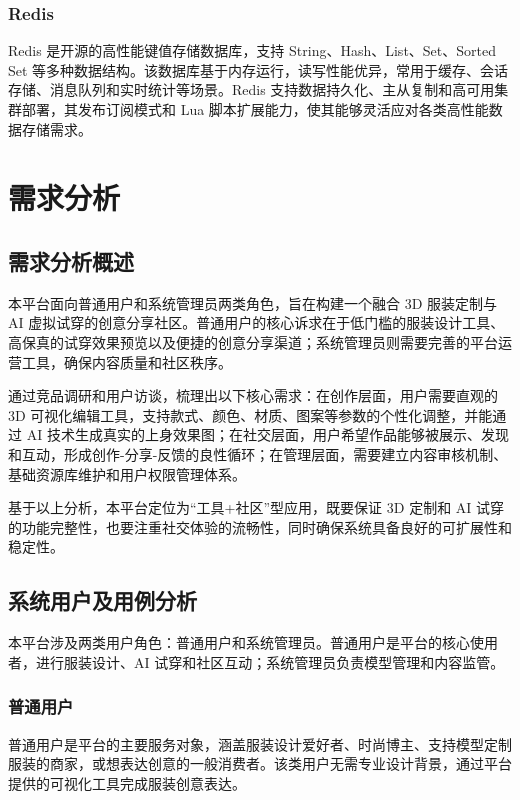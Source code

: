 \documentclass[twoside]{thesis-cls-Miya} %
\begin{document}
\subsection{Redis}
Redis 是开源的高性能键值存储数据库\cite{redis_docs}，支持 String、Hash、List、Set、Sorted Set 等多种数据结构。该数据库基于内存运行，读写性能优异，常用于缓存、会话存储、消息队列和实时统计等场景。Redis 支持数据持久化、主从复制和高可用集群部署，其发布订阅模式和 Lua 脚本扩展能力，使其能够灵活应对各类高性能数据存储需求。

\chapter{需求分析}

\section{需求分析概述}

本平台面向普通用户和系统管理员两类角色，旨在构建一个融合 3D 服装定制与 AI 虚拟试穿的创意分享社区。普通用户的核心诉求在于低门槛的服装设计工具、高保真的试穿效果预览以及便捷的创意分享渠道；系统管理员则需要完善的平台运营工具，确保内容质量和社区秩序。

通过竞品调研和用户访谈，梳理出以下核心需求：在创作层面，用户需要直观的 3D 可视化编辑工具，支持款式、颜色、材质、图案等参数的个性化调整，并能通过 AI 技术生成真实的上身效果图；在社交层面，用户希望作品能够被展示、发现和互动，形成创作\texorpdfstring{-}{-}分享\texorpdfstring{-}{-}反馈的良性循环；在管理层面，需要建立内容审核机制、基础资源库维护和用户权限管理体系。

基于以上分析，本平台定位为“工具+社区”型应用，既要保证 3D 定制和 AI 试穿的功能完整性，也要注重社交体验的流畅性，同时确保系统具备良好的可扩展性和稳定性。

\section{系统用户及用例分析}

本平台涉及两类用户角色：普通用户和系统管理员。普通用户是平台的核心使用者，进行服装设计、AI 试穿和社区互动；系统管理员负责模型管理和内容监管。

\subsection{普通用户}

普通用户是平台的主要服务对象，涵盖服装设计爱好者、时尚博主、支持模型定制服装的商家，或想表达创意的一般消费者。该类用户无需专业设计背景，通过平台提供的可视化工具完成服装创意表达。
\end{document}
